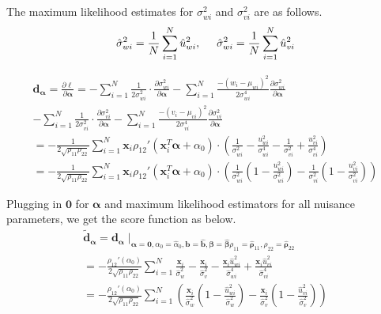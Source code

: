\documentclass[aap,authoryear, preprint]{imsart}
\numberwithin{equation}{section}
\theoremstyle{plain}
\begin{document}
\noindent The maximum likelihood estimates for $\sigma_{wi}^2$ and $\sigma_{vi}^2$ are as follows.
$$\hat{\sigma}_{wi}^2 = \frac{1}{N} \sum_{i=1}^{N} \hat{u}_{wi}^2, \hspace{5mm} 
\hat{\sigma}_{wi}^2 = \frac{1}{N} \sum_{i=1}^{N} \hat{u}_{vi}^2$$

\begin{equation}
    \begin{multlined}
    \bm{d}_{\bm{\alpha}} = \frac{\partial \ell}{\partial \bm{\alpha}} = - \sum_{i=1}^{N} \frac{1}{2\sigma_{wi}^2} \cdot \frac{\partial \sigma_{wi}^2}{\partial \bm{\alpha}} - \sum_{i=1}^{N} \frac{-(w_i - \mu_{wi})^2}{2\sigma_{wi}^4} \frac{\partial \sigma_{wi}^2}{\partial \bm{\alpha}}\\
    - \sum_{i=1}^{N} \frac{1}{2\sigma_{vi}^2} \cdot \frac{\partial \sigma_{vi}^2}{\partial \bm{\alpha}} - \sum_{i=1}^{N} \frac{-(v_i - \mu_{vi})^2}{2\sigma_{vi}^4} \frac{\partial \sigma_{vi}^2}{\partial \bm{\alpha}}\\
    =-\frac{1}{2\sqrt{\rho_{11}\rho_{22}}} \sum_{i=1}^{N} \bm{x}_i \rho_{12}'(\bm{x}_i^T\bm{\alpha} + \alpha_0) \cdot \left(
    \frac{1}{\sigma_{wi}^2} - \frac{u_{wi}^2}{\sigma_{wi}^4} 
    - \frac{1}{\sigma_{vi}^2} + \frac{u_{vi}^2}{\sigma_{vi}^4}
    \right)\\
    = -\frac{1}{2\sqrt{\rho_{11}\rho_{22}}} \sum_{i=1}^{N} \bm{x}_i\rho_{12}'(\bm{x}_i^T \bm{\alpha}+\alpha_0) \cdot 
    \left(
    \frac{1}{\sigma_{wi}^2} \left( 1 - \frac{u_{wi}^2}{\sigma_{wi}^2}\right) - 
    \frac{1}{\sigma_{vi}^2} \left( 1 - \frac{u_{vi}^2}{\sigma_{vi}^2} \right)
    \right)
    \end{multlined}
\end{equation}

Plugging in $\bm{0}$ for $\bm{\alpha}$ and maximum likelihood estimators for all nuisance parameters, we get the score function as below. 
\begin{equation}
    \begin{multlined}
    \bm{\tilde{d}}_{\bm{\alpha}} = \bm{d}_{\bm{\alpha}}\mid_{\bm{\alpha}=\bm{0}, \alpha_0 = \hat{\alpha}_0, \bm{b} = \bm{\hat{b}},\bm{\beta} = \bm{\hat{\beta}}
    {\rho}_{11} = {\bm{\hat{\rho}}_{11}},
    {\rho}_{22} = {\bm{\hat{\rho}}_{22}}}\\
    = -\frac{\rho_{12}'(\alpha_0)}{2\sqrt{\rho_{11}\rho_{22}}} \sum_{i=1}^{N} \frac{\bm{x}_i}{\hat{\sigma}_{w}^2} - \frac{\bm{x}_i}{\hat{\sigma}_{v}^2} - \frac{\bm{x}_i \hat{u}_{wi}^2}{\hat{\sigma}_{wi}^4} + \frac{\bm{x}_i \hat{u}_{vi}^2}{\hat{\sigma}_{vi}^4}\\
    = -\frac{\rho_{12}'(\alpha_0)}{2\sqrt{\rho_{11}\rho_{22}}} \sum_{i=1}^{N} \left(
    \frac{\bm{x}_i}{\hat{\sigma}_{w}^2}
    \left( 1-\frac{\hat{u}_{wi}^2}{\hat{\sigma}_{w}^2}\right) - 
    \frac{\bm{x}_i}{\hat{\sigma}_{v}^2}
    \left( 1-\frac{\hat{u}_{vi}^2}{\hat{\sigma}_{v}^2}\right) 
    \right)
    \end{multlined}
\end{equation}
\end{document}
